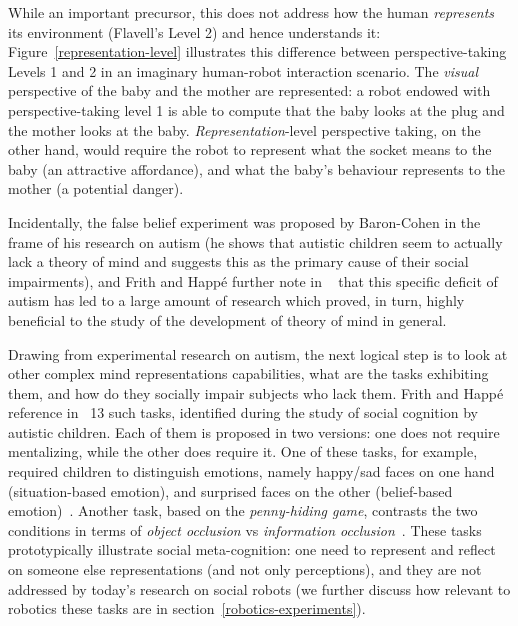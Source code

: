 \documentclass{sig-alternate}
\begin{document}
While an important precursor, this does not address how the human
\emph{represents} its environment (Flavell's Level 2) and hence understands it:
Figure~\ref{representation-level} illustrates this difference between
perspective-taking Levels 1 and 2 in an imaginary human-robot interaction
scenario. The \emph{visual} perspective of the baby and the mother are
represented: a robot endowed with perspective-taking level 1 is able to compute
that the baby looks at the plug and the mother looks at the baby.
\emph{Representation}-level perspective taking, on the other hand, would require
the robot to represent what the socket means to the baby (an attractive
affordance), and what the baby's behaviour represents to the mother (a potential
danger).


Incidentally, the false belief experiment was proposed by Baron-Cohen in the
frame of his research on autism (he shows that autistic children seem to
actually lack a theory of mind and suggests this as the primary cause of their
social impairments), and Frith and Happé further note in ~\cite{frith1994autism}
that this specific deficit of autism has led to a large amount of research which
proved, in turn, highly beneficial to the study of the development of theory of
mind in general.

Drawing from experimental research on autism, the next logical step is to look
at other complex mind representations capabilities, what are the tasks
exhibiting them, and how do they socially impair subjects who lack them.  Frith
and Happé reference in~\cite{frith1994autism} 13 such tasks, identified during
the study of social cognition by autistic children. Each of them is proposed in
two versions: one does not require mentalizing, while the other does require it.
One of these tasks, for example, required children to distinguish emotions,
namely happy/sad faces on one hand (situation-based emotion), and surprised
faces on the other (belief-based emotion)~\cite{baron1993children}.  Another
task, based on the \emph{penny-hiding game}, contrasts the two conditions in
terms of \emph{object occlusion} vs \emph{information
occlusion}~\cite{baron1992out}. These tasks prototypically illustrate social
meta-cognition: one need to represent and reflect on someone else
representations (and not only perceptions), and they are not addressed by
today's research on social robots (we further discuss how relevant to robotics
these tasks are in section~\ref{robotics-experiments}).
\end{document}
